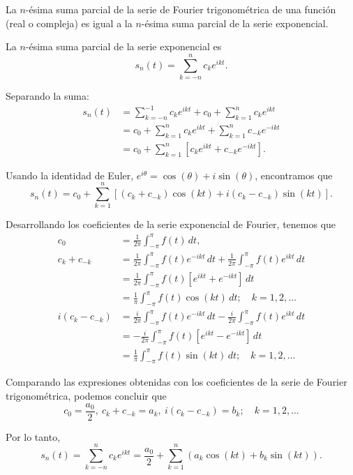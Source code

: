 \begin{propo} \label{TrigoExpo}
La $n$-ésima suma parcial de la serie de Fourier trigonométrica de una función (real o compleja) es igual a la $n$-ésima suma parcial de la serie exponencial.
\end{propo}

\begin{demo}
La $n$-ésima suma parcial de la serie exponencial es
$$ s_n(t) = \sum_{k=-n}^n c_k e^{ikt}.$$

Separando la suma:
\begin{align*}
    s_n(t) &= \sum_{k=-n}^{-1} c_k e^{ikt} + c_0 + \sum_{k=1}^n c_k e^{ikt} \\
    &= c_0 + \sum_{k=1}^n c_k e^{ikt} + \sum_{k=1}^n c_{-k} e^{-ikt} \\
    &= c_0 + \sum_{k=1}^n [c_k e^{ikt} + c_{-k} e^{-ikt}]. 
\end{align*}

Usando la identidad de Euler, $e^{i\theta} = \cos(\theta) + i \sin(\theta)$, encontramos que
$$s_n(t) = c_0 +  \sum_{k=1}^n [(c_k + c_{-k}) \cos(kt) + i(c_k - c_{-k}) \sin(kt)].$$

Desarrollando los coeficientes de la serie exponencial de Fourier, tenemos que
\begin{align*}
    c_0 &= \frac{1}{2\pi} \int_{-\pi}^{\pi} f(t) \,dt, \\
    c_k + c_{-k} &= \frac{1}{2\pi} \int_{-\pi}^{\pi} f(t) e^{-ikt} \,dt + \frac{1}{2\pi} \int_{-\pi}^{\pi} f(t) e^{ikt} \,dt  \\
    &= \frac{1}{2\pi} \int_{-\pi}^{\pi} f(t) [e^{ikt} + e^{-ikt}] \,dt \\
    &= \frac{1}{\pi} \int_{-\pi}^{\pi} f(t) \cos(kt) \,dt; \quad k = 1,2, \dots\\
   i( c_k - c_{-k}) &= \frac{i}{2\pi} \int_{-\pi}^{\pi} f(t) e^{-ikt} \,dt - \frac{i}{2\pi} \int_{-\pi}^{\pi} f(t) e^{ikt} \,dt \\
   &= - \frac{i}{2\pi} \int_{-\pi}^{\pi} f(t) [e^{ikt} - e^{-ikt}] \,dt \\
   &= \frac{1}{\pi} \int_{-\pi}^{\pi} f(t) \sin(kt)\,dt; \quad k = 1,2, \dots
\end{align*}

Comparando las expresiones obtenidas con los coeficientes de la serie de Fourier trigonométrica, podemos concluir que 
$$c_0 = \frac{a_0}{2}, ~  c_k + c_{-k} = a_k, ~ i( c_k - c_{-k}) = b_k; \quad k = 1,2, \dots$$

Por lo tanto, 
$$ s_n(t) = \sum_{k=-n}^n c_k e^{ikt} = \frac{a_0}{2} + \sum_{k=1}^n (a_k \cos(kt) + b_k \sin(kt)).$$

\end{demo}

